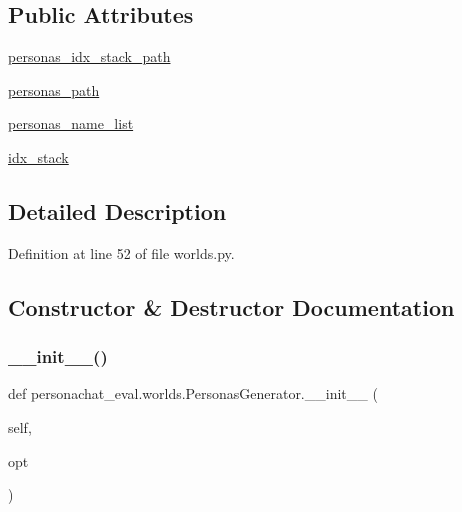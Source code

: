 \subsection*{Public Attributes}
\begin{DoxyCompactItemize}
\item 
\hyperlink{classpersonachat__eval_1_1worlds_1_1PersonasGenerator_a9f5f33e98c5ca888b345a0adfb799fe7}{personas\+\_\+idx\+\_\+stack\+\_\+path}
\item 
\hyperlink{classpersonachat__eval_1_1worlds_1_1PersonasGenerator_a8d78d1748f246ca5a3313dd0719772b2}{personas\+\_\+path}
\item 
\hyperlink{classpersonachat__eval_1_1worlds_1_1PersonasGenerator_a93f6fd5e10e1fadb6f4494d223978992}{personas\+\_\+name\+\_\+list}
\item 
\hyperlink{classpersonachat__eval_1_1worlds_1_1PersonasGenerator_a0065bfc8c429bc99b4c180315a2a33dd}{idx\+\_\+stack}
\end{DoxyCompactItemize}


\subsection{Detailed Description}


Definition at line 52 of file worlds.\+py.



\subsection{Constructor \& Destructor Documentation}
\mbox{\label{classpersonachat__eval_1_1worlds_1_1PersonasGenerator_a1040c1f204e103d16f0a8137c1dec671}} 
\subsubsection{\texorpdfstring{\+\_\+\+\_\+init\+\_\+\+\_\+()}{\_\_init\_\_()}}
{\footnotesize\ttfamily def personachat\+\_\+eval.\+worlds.\+Personas\+Generator.\+\_\+\+\_\+init\+\_\+\+\_\+ (\begin{DoxyParamCaption}\item[{}]{self,  }\item[{}]{opt }\end{DoxyParamCaption})}



